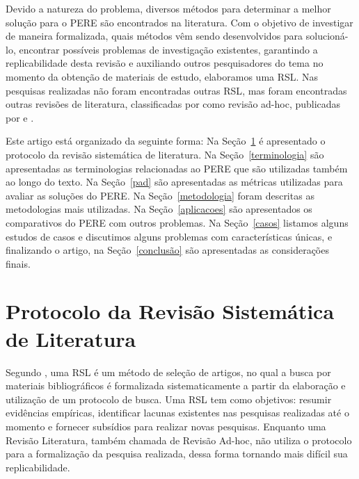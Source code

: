 Devido a natureza do problema, diversos métodos para determinar a melhor solução para o \ac{PERE} são encontrados na literatura. Com o objetivo de investigar de maneira formalizada, quais métodos vêm sendo desenvolvidos para solucioná-lo, encontrar  possíveis problemas de investigação existentes, garantindo a replicabilidade desta revisão e  auxiliando outros pesquisadores do tema no momento da obtenção de materiais de estudo, elaboramos uma \ac{RSL}.
Nas pesquisas realizadas não foram encontradas outras \ac{RSL}, mas foram encontradas outras revisões de literatura, classificadas por  como revisão ad-hoc,  publicadas por  e .


Este artigo está organizado da seguinte forma:  Na Seção~\ref{protocolo} é apresentado o protocolo da revisão sistemática de literatura. Na Seção~\ref{terminologia}  são apresentadas as terminologias relacionadas ao PERE que são utilizadas também ao longo do texto. Na Seção~\ref{pad} são apresentadas as métricas utilizadas para avaliar as soluções do \ac{PERE}. Na Seção~\ref{metodologia}  foram descritas as metodologias mais utilizadas. Na Seção~\ref{aplicacoes} são apresentados os comparativos do \ac{PERE} com outros problemas. Na Seção~\ref{casos} listamos alguns estudos de casos e discutimos alguns problemas com características únicas, e finalizando o artigo, na Seção~\ref{conclusão} são apresentadas as considerações finais.

\section{\esp Protocolo da Revisão Sistemática de Literatura }\label{protocolo}

Segundo , uma \ac{RSL} é um método de seleção de artigos, no qual a busca por materiais bibliográficos é formalizada sistematicamente a partir da elaboração e utilização de um protocolo de busca. Uma \ac{RSL} tem como objetivos: resumir evidências empíricas, identificar lacunas existentes nas pesquisas realizadas até o momento e fornecer subsídios para realizar novas pesquisas.
Enquanto uma Revisão Literatura, também chamada de Revisão Ad-hoc, não utiliza o protocolo para a formalização da pesquisa realizada, dessa forma tornando mais difícil sua replicabilidade.

